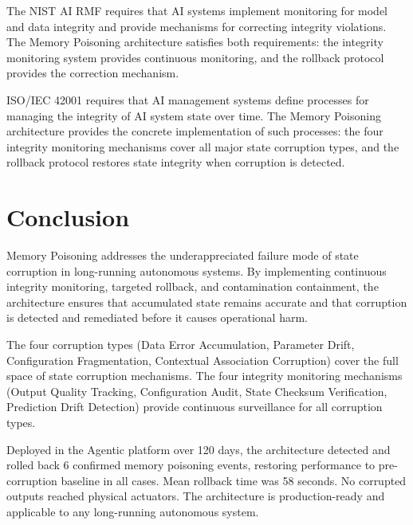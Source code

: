 \documentclass[12pt]{article}
\begin{document}
The NIST AI RMF \cite{nist2023} requires that AI systems implement monitoring for model and data integrity and provide mechanisms for correcting integrity violations. The Memory Poisoning architecture satisfies both requirements: the integrity monitoring system provides continuous monitoring, and the rollback protocol provides the correction mechanism.

ISO/IEC 42001 \cite{iso2023} requires that AI management systems define processes for managing the integrity of AI system state over time. The Memory Poisoning architecture provides the concrete implementation of such processes: the four integrity monitoring mechanisms cover all major state corruption types, and the rollback protocol restores state integrity when corruption is detected.

\section{Conclusion}
Memory Poisoning addresses the underappreciated failure mode of state corruption in long-running autonomous systems. By implementing continuous integrity monitoring, targeted rollback, and contamination containment, the architecture ensures that accumulated state remains accurate and that corruption is detected and remediated before it causes operational harm.

The four corruption types (Data Error Accumulation, Parameter Drift, Configuration Fragmentation, Contextual Association Corruption) cover the full space of state corruption mechanisms. The four integrity monitoring mechanisms (Output Quality Tracking, Configuration Audit, State Checksum Verification, Prediction Drift Detection) provide continuous surveillance for all corruption types.

Deployed in the Agentic platform over 120 days, the architecture detected and rolled back 6 confirmed memory poisoning events, restoring performance to pre-corruption baseline in all cases. Mean rollback time was 58 seconds. No corrupted outputs reached physical actuators. The architecture is production-ready and applicable to any long-running autonomous system.



\end{document}
